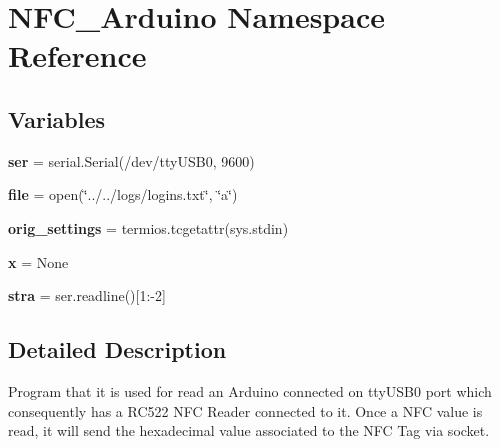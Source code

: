 \hypertarget{namespaceNFC__Arduino}{}\section{N\+F\+C\+\_\+\+Arduino Namespace Reference}
\label{namespaceNFC__Arduino}
\subsection*{Variables}
\begin{DoxyCompactItemize}
\item 
{\bfseries ser} = serial.\+Serial(\textquotesingle{}/dev/tty\+U\+S\+B0\textquotesingle{}, 9600)\hypertarget{namespaceNFC__Arduino_a098df137056dd8f9401fc6ef83860406}{}\label{namespaceNFC__Arduino_a098df137056dd8f9401fc6ef83860406}

\item 
{\bfseries file} = open(\char`\"{}../../logs/logins.\+txt\char`\"{}, \char`\"{}a\char`\"{})\hypertarget{namespaceNFC__Arduino_acb7751cf964ffc03e1d78e06be636342}{}\label{namespaceNFC__Arduino_acb7751cf964ffc03e1d78e06be636342}

\item 
{\bfseries orig\+\_\+settings} = termios.\+tcgetattr(sys.\+stdin)\hypertarget{namespaceNFC__Arduino_afe70bff8432edcf8b18a189291eaff07}{}\label{namespaceNFC__Arduino_afe70bff8432edcf8b18a189291eaff07}

\item 
{\bfseries x} = None\hypertarget{namespaceNFC__Arduino_ae79f4584094541969c8ffe997d8e5a85}{}\label{namespaceNFC__Arduino_ae79f4584094541969c8ffe997d8e5a85}

\item 
{\bfseries stra} = ser.\+readline()\mbox{[}1\+:-\/2\mbox{]}\hypertarget{namespaceNFC__Arduino_a0f727b9d3472b437ae591c225f0bf456}{}\label{namespaceNFC__Arduino_a0f727b9d3472b437ae591c225f0bf456}

\end{DoxyCompactItemize}


\subsection{Detailed Description}
\begin{DoxyVerb}Program that it is used for read an Arduino connected on ttyUSB0 port which consequently has a RC522 NFC Reader connected to it.
Once a NFC value is read, it will send the hexadecimal value associated to the NFC Tag via socket.
\end{DoxyVerb}
 